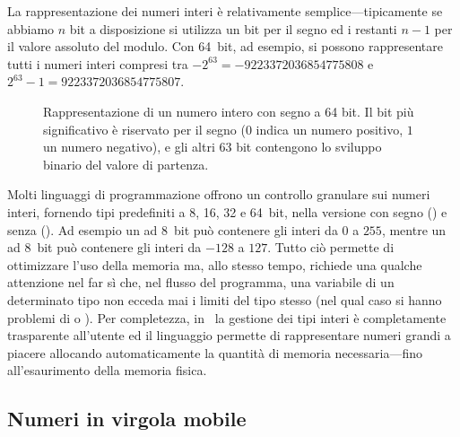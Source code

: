 La rappresentazione dei numeri interi è relativamente semplice---tipicamente
se abbiamo $n$ bit a disposizione si utilizza un bit per il segno
ed i restanti $n - 1$ per il valore assoluto del modulo. Con 64~bit,
ad esempio, si possono rappresentare tutti i numeri interi compresi tra
$-2^{63} = -9223372036854775808$ e $2^{63} - 1 = 9223372036854775807$.

\begin{figure}[!htbp]
  \center
  \vspace*{-15pt}
  \caption{Rappresentazione di un numero intero con segno a 64 bit. Il bit
  più significativo è riservato per il segno ($0$ indica un numero
  positivo, $1$ un numero negativo), e gli altri 63 bit contengono lo sviluppo
  binario del valore di partenza.}
  \label{fig:rappresentazione_interi}
\end{figure}

Molti linguaggi di programmazione offrono un controllo granulare sui numeri
interi, fornendo tipi predefiniti a 8, 16, 32 e 64~bit,
nella versione con segno () e senza (). Ad esempio
un  ad 8~bit può contenere gli interi da $0$ a $255$,
mentre un  ad 8~bit può contenere gli interi da $-128$ a
$127$. Tutto ciò permette di ottimizzare l'uso della memoria ma, allo stesso
tempo, richiede una qualche attenzione nel far sì che, nel flusso del
programma, una variabile di un determinato tipo non ecceda mai i limiti del
tipo stesso (nel qual caso si hanno problemi di  o
). Per completezza, in \python\ la gestione dei tipi interi
è completamente trasparente all'utente ed il linguaggio permette di
rappresentare numeri grandi a piacere allocando automaticamente la quantità
di memoria necessaria---fino all'esaurimento della memoria fisica.


\subsection{Numeri in virgola mobile}

